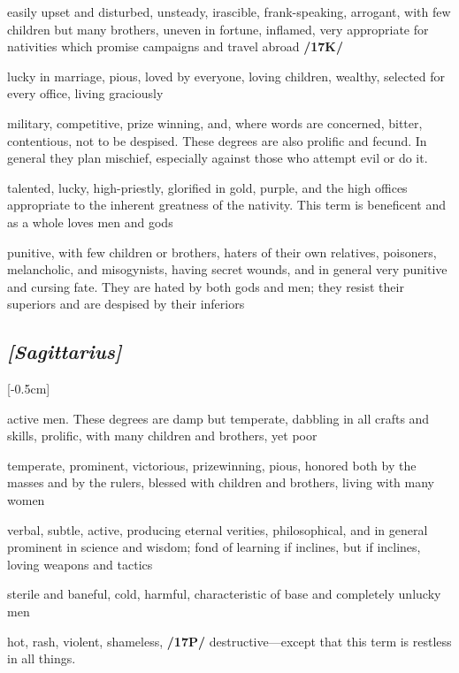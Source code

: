 \begin{description}[labelindent=0em , labelwidth=1em, labelsep=1em, leftmargin =!]
\item[\Mars]
	[0-6] easily upset and disturbed, unsteady, irascible, frank-speaking, arrogant, with few children but many brothers, uneven in fortune, inflamed, very appropriate for nativities which promise campaigns and travel abroad \textbf{/17K/}
\item[\Venus]
	[7-10] lucky in marriage, pious, loved by everyone, loving children, wealthy, selected for every office, living graciously
\item[\Mercury]
	[11-18] military, competitive, prize winning, and, where words are concerned, bitter, contentious, not to be despised. These degrees are also prolific and fecund. In general they plan mischief, especially against those who attempt evil or do it.
\item[\Jupiter]
	[19-23] talented, lucky, high-priestly, glorified in gold, purple, and the high offices appropriate to the inherent greatness of the nativity. This term is beneficent and as a whole loves men and gods
\item[\Saturn]
	[24-29] punitive, with few children or brothers, haters of their own relatives, poisoners, melancholic, and misogynists, having secret wounds, and in general very punitive and cursing fate. They are hated by both gods and men; they resist their superiors and are despised by their inferiors
\end{description}

\subsection{\textit{[Sagittarius]}}
\marginnote{\Sagittarius}[-0.5cm]
\vspace{-1mm}

\begin{description}[labelindent=0em , labelwidth=1em, labelsep=1em, leftmargin =!]
\item[\Jupiter]
	[0-11] active men. These degrees are damp but temperate,
dabbling in all crafts and skills, prolific, with many children and brothers, yet poor
\item[\Venus]
	[12-16] temperate, prominent, victorious, prizewinning, pious, honored both by the masses and by the rulers, blessed with children and brothers, living with many women
\item[\Mercury]
	[17-20] verbal, subtle, active, producing eternal verities, philosophical, and in general prominent in science and wisdom; fond of learning if \Mercury\xspace inclines, but if \Mars\xspace inclines, loving weapons and tactics	
\item[\Saturn]
	[21-25] sterile and baneful, cold, harmful, characteristic of base and completely unlucky men	
\item[\Mars]
	[26-29] hot, rash, violent, shameless, \textbf{/17P/} destructive—except that this term is restless in all things. 
\end{description}

